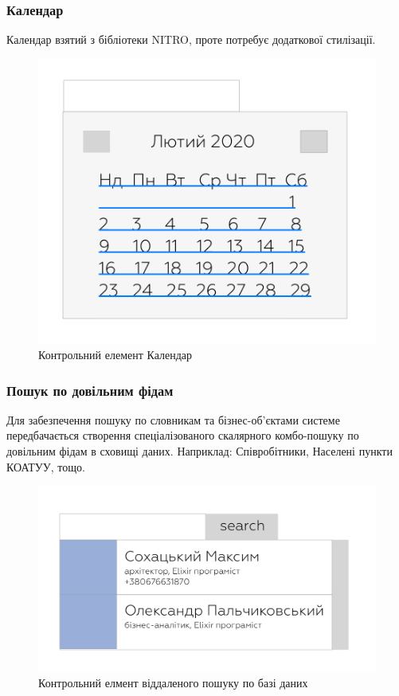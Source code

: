 \subsubsection{Календар}

Календар взятий з бібліотеки NITRO, проте потребує додаткової стилізації.

\begin{figure}[!htbp]
\centerline{\includegraphics[scale=0.4]{calendar.png}}
\caption{Контрольний елемент Календар}
\end{figure}

\newpage
\subsubsection{Пошук по довільним фідам}

Для забезпечення пошуку по словникам та бізнес-об'єктами системе
передбачається створення спеціалізованого скалярного комбо-пошуку по довільним
фідам в сховищі даних. Наприклад: Співробітники, Населені пункти КОАТУУ, тощо.

\begin{figure}[!htbp]
\centerline{\includegraphics[scale=0.3]{comboLookup.png}}
\caption{Контрольний елмент віддаленого пошуку по базі даних}
\end{figure}

